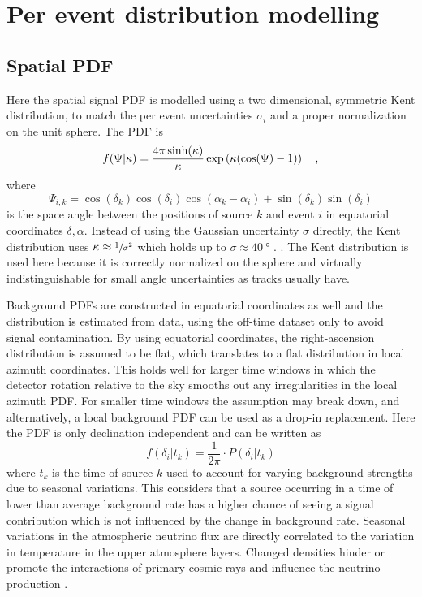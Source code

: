 \section{Per event distribution modelling}
\subsection*{Spatial PDF}
Here the spatial signal PDF is modelled using a two dimensional, symmetric Kent distribution, to match the per event uncertainties $\sigma_i$ and a proper normalization on the unit sphere.
The PDF is
\begin{equation}
  f(\Psi|\kappa)
  = \frac{4\pi \sinh(\kappa)}{\kappa}\exp\left(\kappa(\cos(\Psi)-1)\right)
  \quad\text{,}
\end{equation}
where
\begin{equation}
  \Psi_{i,k}
  = \cos(\delta_k)\cos(\delta_i)\cos(\alpha_k - \alpha_i) +
    \sin(\delta_k)\sin(\delta_i)
\end{equation}
is the space angle between the positions of source $k$ and event $i$ in equatorial coordinates $\delta, \alpha$.
Instead of using the Gaussian uncertainty $\sigma$ directly, the Kent distribution uses $\kappa \approx \sfrac{1}{\sigma^2}$ which holds up to $\sigma \approx \SI{40}{\degree}$ \cite{Yasutomi:2014kent,Jakob:2012kent}.
.
The Kent distribution is used here because it is correctly normalized on the sphere and virtually indistinguishable for small angle uncertainties as tracks usually have.

Background PDFs are constructed in equatorial coordinates as well and the distribution is estimated from data, using the off-time dataset only to avoid signal contamination.
By using equatorial coordinates, the right-ascension distribution is assumed to be flat, which translates to a flat distribution in local azimuth coordinates.
This holds well for larger time windows in which the detector rotation relative to the sky smooths out any irregularities in the local azimuth PDF.
For smaller time windows the assumption may break down, and alternatively, a local background PDF can be used as a drop-in replacement.
Here the PDF is only declination independent and can be written as
\begin{equation}
  f(\delta_i|t_k) = \frac{1}{2\pi}\cdot P(\delta_i|t_k)
\end{equation}
where $t_k$ is the time of source $k$ used to account for varying background strengths due to seasonal variations.
This considers that a source occurring in a time of lower than average background rate has a higher chance of seeing a signal contribution which is not influenced by the change in background rate.
Seasonal variations in the atmospheric neutrino flux are directly correlated to the variation in temperature in the upper atmosphere layers.
Changed densities hinder or promote the interactions of primary cosmic rays and influence the neutrino production \cite{Barret:1952seasons,Gaisser:2010seasons,Gaisser:2013icrc,GRASHORN2010140}.

